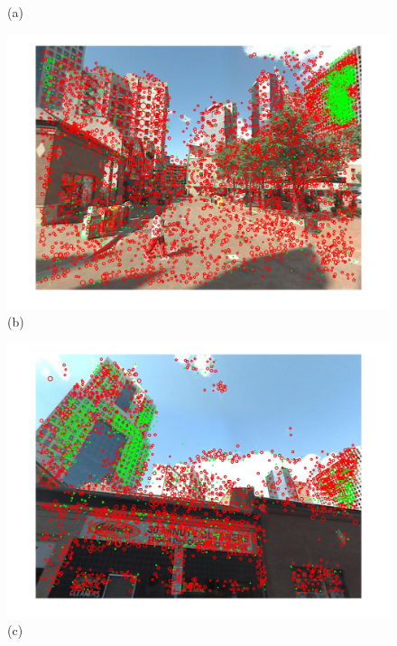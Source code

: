 \begin{figure}
\begin{minipage}{0.48\linewidth}
\begin{minipage}{\wii}
            \newline
            (a)
          \end{minipage}  
          \begin{minipage}{\wii}
            \centering
            \includegraphics[width=\linewidth]{imgs/wVS3q/2932/bftrs.jpg}
            \newline
            (b)
          \end{minipage}  
          \begin{minipage}{\wii}
            \centering
            \includegraphics[width=\linewidth]{imgs/wVS3q/2932/cftrs.jpg}
            \newline
            (c)
          \end{minipage} 
    \end{minipage}%
    \vspace*{-2mm}
    \caption{\myCap}
    \label{fig:3qVSw}
        \vspace*{2mm}
    \end{figure}